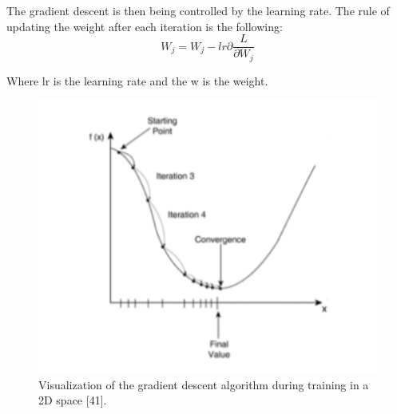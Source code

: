 The gradient descent is then being controlled by the learning rate. The rule of updating the weight after each iteration is the following:
\begin{equation}
    W_{j} = W_{j} - lr\partial \frac{L}{\partial W_{j}}
\end{equation}


Where lr is the learning rate and the w is the weight.
\begin{figure}[ht]
\centering
\includegraphics{Figures/lr1}
\decoRule
\caption[Visualization of the gradient descent algorithm during training in a 2D space "41"]{Visualization of the gradient descent algorithm during training in a 2D space [41].}
\label{fig:la1}
\end{figure}

